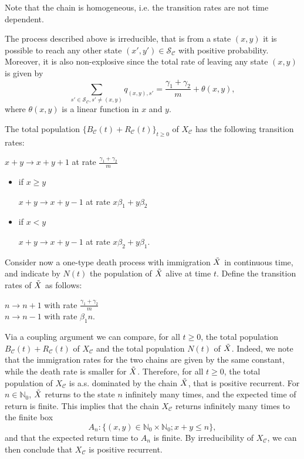 \documentclass{article}
\theoremstyle{remark}
\newtheorem*{partial proof}{Partial proof of the Conjecture}
\begin{document}
Note that the chain is homogeneous, i.e. the transition rates are not time dependent.

The process described above is irreducible, that is from a state $(x,y)$ it is possible to reach any other state $(x',y') \in \mathcal{S}_\mathcal{C}$ with positive probability. Moreover, it is also non-explosive since the total rate of leaving any state $(x,y)$ is given by
$$
\sum_{s' \in \mathcal{S}_\mathcal{C}, s' \neq (x,y)} q_{(x,y),s'}=\frac{\gamma_1+\gamma_2}{m} + \theta(x,y),
$$
where $\theta(x,y)$ is a linear function in $x$ and $y$.

The total population $\{B_\mathcal{C}(t)+R_\mathcal{C}(t)\}_{t\geq 0}$ of $X_\mathcal{C}$ has the following transition rates:
\begin{center}
    $x+y \to x+y+1$ at rate $\frac{\gamma_1+\gamma_2}{m}$\\
\end{center}
\begin{itemize}
    \item if $x\geq y$
    \begin{center}
        $x+y \to x+y-1$ at rate $x\beta_1 +y\beta_2$
    \end{center}
    \item if $x<y$
    \begin{center}
        $x+y \to x+y-1$ at rate $x\beta_2+y\beta_1$.
    \end{center}
\end{itemize}


Consider now a one-type death process with immigration $\Tilde{X}$ in continuous time, and indicate by $N(t)$ the population of $\Tilde{X}$ alive at time $t$. Define the transition rates of $\Tilde{X}$ as follows:
\begin{center}
    $n \to n+1$ with rate $\frac{\gamma_1 +\gamma_2}{m}$\\
    $n \to n-1$ with rate $\beta_1 n$.
\end{center}
Via a coupling argument we can compare, for all $t \geq 0$, the total population $B_\mathcal{C}(t)+R_\mathcal{C}(t)$ of $X_\mathcal{C}$ and the total population $N(t)$ of $\Tilde{X}$. Indeed, we note that the immigration rates for the two chains are given by the same constant, while the death rate is smaller for $\Tilde{X}$. Therefore, for all $t \geq 0$, the total population of $X_\mathcal{C}$ is a.s. dominated by the chain $\Tilde{X}$, that is positive recurrent. For $n \in \mathbb{N}_0$, $\Tilde{X}$ returns to the state $n$ infinitely many times, and the expected time of return is finite. This implies that the chain $X_\mathcal{C}$ returns infinitely many times to the finite box
$$
A_n :\{ (x,y) \in \mathbb{N}_0\times \mathbb{N}_0; x+y\leq n\},
$$
and that the expected return time to $A_n$ is finite. By irreducibility of $X_\mathcal{C}$, we can then conclude that $X_\mathcal{C}$ is positive recurrent.
\end{document}
